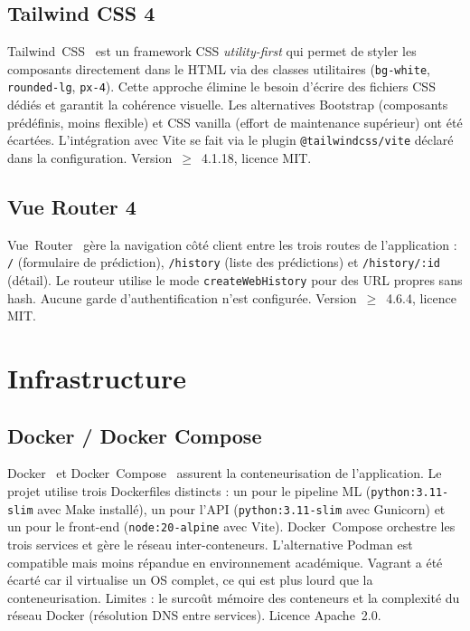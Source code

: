 \documentclass[12pt,a4paper,openany]{report}
\begin{document}
\subsection{Tailwind CSS 4}

Tailwind~CSS~\cite{tailwindcss} est un framework CSS \emph{utility-first} qui permet de styler les composants directement dans le HTML via des classes utilitaires (\texttt{bg-white}, \texttt{rounded-lg}, \texttt{px-4}). Cette approche élimine le besoin d'écrire des fichiers CSS dédiés et garantit la cohérence visuelle. Les alternatives Bootstrap (composants prédéfinis, moins flexible) et CSS vanilla (effort de maintenance supérieur) ont été écartées. L'intégration avec Vite se fait via le plugin \texttt{@tailwindcss/vite} déclaré dans la configuration. Version~$\geq$~4.1.18, licence MIT.

\subsection{Vue Router 4}

Vue~Router~\cite{vuerouter} gère la navigation côté client entre les trois routes de l'application : \texttt{/} (formulaire de prédiction), \texttt{/history} (liste des prédictions) et \texttt{/history/:id} (détail). Le routeur utilise le mode \texttt{createWebHistory} pour des URL propres sans hash. Aucune garde d'authentification n'est configurée. Version~$\geq$~4.6.4, licence MIT.

\section{Infrastructure}

\subsection{Docker / Docker Compose}
Docker~\cite{docker} et Docker~Compose~\cite{dockercompose} assurent la conteneurisation de l'application. Le projet utilise trois Dockerfiles distincts : un pour le pipeline ML (\texttt{python:3.11-slim} avec Make installé), un pour l'API (\texttt{python:3.11-slim} avec Gunicorn) et un pour le front-end (\texttt{node:20-alpine} avec Vite). Docker~Compose orchestre les trois services et gère le réseau inter-conteneurs. L'alternative Podman est compatible mais moins répandue en environnement académique. Vagrant a été écarté car il virtualise un OS complet, ce qui est plus lourd que la conteneurisation. Limites : le surcoût mémoire des conteneurs et la complexité du réseau Docker (résolution DNS entre services). Licence Apache~2.0.
\end{document}
